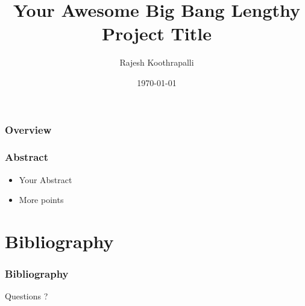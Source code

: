 \documentclass{beamer}
\title[Big Bang Theory]{Your Awesome Big Bang Lengthy Project Title}
\author{Rajesh Koothrapalli}
\institute[SOIS]
{
	Manipal University \\
	\medskip
	\textit{rjko@bbt.com}
}
\date{\today}
\begin{document}
\begin{frame}
	\titlepage
\end{frame}

\begin{frame}
	\frametitle{Overview}
	\tableofcontents
\end{frame}

\begin{frame}
	\frametitle{Abstract}
	\begin{itemize}
		\item Your Abstract
		\item More points
	\end{itemize}

\end{frame}





\section{Bibliography}
\begin{frame}
	\frametitle{Bibliography}
	\nocite{*}
	
	
	\vspace{0.2cm}
	{\Huge{\centerline{Questions ?}}}
\end{frame}
\end{document}
